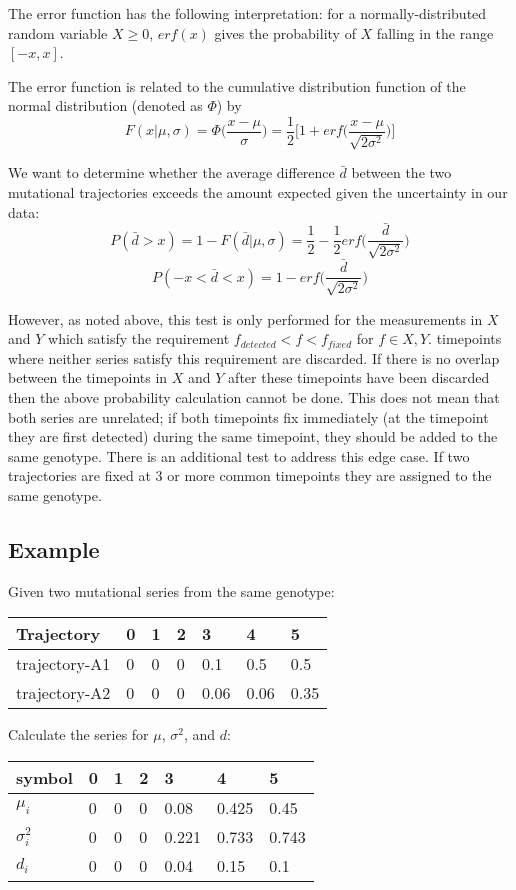 \documentclass{report}
\begin{document}
The error function has the following interpretation: for a normally-distributed random variable $X \ge 0$, $erf(x)$ gives the probability of $X$ falling in the range $[-x,x]$.

The error function is related to the cumulative distribution function of the normal distribution (denoted as $\Phi$) by
$$
F(x|\mu,\sigma) = \Phi\bigg(\frac{x-\mu}{\sigma}\bigg)= \frac{1}{2}\bigg[1 + erf \bigg(\frac{x-\mu}{\sqrt{2\sigma^2}}\bigg)\bigg]
$$

We want to determine whether the average difference $\bar{d}$ between the two mutational trajectories exceeds the amount expected given the uncertainty in our data:
$$
P(\bar{d} > x) = 1-F(\bar{d}|\mu, \sigma) = \frac{1}{2} - \frac{1}{2}erf \bigg(\frac{\bar{d}}{\sqrt{2\sigma^2}}\bigg)
$$
$$
P(-x<\bar{d}<x) = 1 - erf \bigg(\frac{\bar{d}}{\sqrt{2\sigma^2}}\bigg)
$$

However, as noted above, this test is only performed for the measurements in $X$ and $Y$ which satisfy the requirement $f_{detected} < f <f_{fixed}$ for $f \in X,Y$. timepoints where neither series satisfy this requirement are discarded. If there is no overlap between the timepoints in $X$ and $Y$ after these timepoints have been discarded then the above probability calculation cannot be done. This does not mean that both series are unrelated; if both timepoints fix immediately (at the timepoint they are first detected) during the same timepoint, they should be added to the same genotype. There is an additional test to address this edge case. If two trajectories are fixed at 3 or more common timepoints they are assigned to the same genotype.


\subsection{Example}
Given two mutational series from the same genotype:


\begin{tabular}{l|llllll}
Trajectory & 0 & 1 & 2 & 3 & 4 & 5 \\
\hline 
trajectory-A1 & 0 & 0 & 0 & 0.1 & 0.5 & 0.5 \\
trajectory-A2 & 0 & 0 & 0 & 0.06 & 0.06 & 0.35 \\
\end{tabular}

Calculate the series for $\mu$, $\sigma^2$, and $d$:


\begin{tabular}{l|llllll}
symbol & 0 & 1 & 2 & 3 & 4 & 5 \\
\hline 
$\mu_i$         & 0 & 0 & 0 & 0.08  & 0.425    & 0.45   \\
$\sigma_i^2$      & 0 & 0 & 0 & 0.221 & 0.733 & 0.743 \\
$d_i$           & 0 & 0 & 0 & 0.04  & 0.15     & 0.1    \\
\end{tabular}
\end{document}
